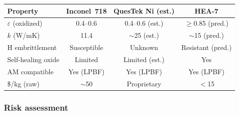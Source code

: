 \documentclass[12pt,letterpaper]{article}
\theoremstyle{definition}
\begin{document}
\begin{center}
\small
\begin{tabular}{@{}lccc@{}}
\toprule
Property & Inconel~718 & QuesTek Ni (est.) & HEA-7 \\
\midrule
$\varepsilon$ (oxidized) & 0.4--0.6 & 0.4--0.6 (est.) & $\geq$0.85 (pred.) \\
$k$ (W/mK) & 11.4 & $\sim$25 (est.) & $\sim$15 (pred.) \\
H embrittlement & Susceptible & Unknown & Resistant (pred.) \\
Self-healing oxide & Limited & Limited (est.) & Yes \\
AM compatible & Yes (LPBF) & Yes (LPBF) & Yes (LPBF) \\
\$/kg (raw) & $\sim$50 & Proprietary & $<$15 \\
\bottomrule
\end{tabular}
\normalsize
\end{center}

\subsubsection{Risk assessment}
\end{document}
